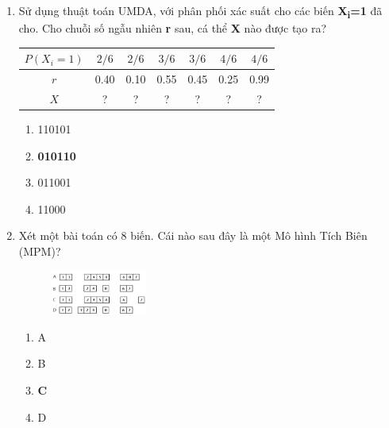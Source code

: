 \documentclass{book}
\begin{document}
\begin{enumerate}
    \item Sử dụng thuật toán UMDA, với phân phối xác suất cho các biến \textbf{X\textsubscript{i}=1} đã cho. Cho chuỗi số ngẫu nhiên \textbf{r} sau, cá thể \textbf{X} nào được tạo ra?
    \begin{table}[H]
        \centering
        \begin{tabular}{|c|c|c|c|c|c|c|}
            \toprule
            $P(X_i=1)$ & $2/6$ & $2/6$ & $3/6$ & $3/6$ & $4/6$ &  $4/6$ \\
            \midrule
            $r$ & 0.40 & 0.10 & 0.55 & 0.45 & 0.25 & 0.99 \\
            \midrule
            $X$ & ? & ? & ? & ? & ? & ? \\
            \bottomrule
        \end{tabular}
    \end{table}
    \begin{multicols}{2}
        \begin{enumerate}[label=\Alph*]
            \item 110101
            \item \textbf{010110}
            \item 011001
            \item 11000
        \end{enumerate}
    \end{multicols}

    \item Xét một bài toán có 8 biến. Cái nào sau đây là một Mô hình Tích Biên (MPM)?
    \begin{figure}[H]
        \centering
        \includegraphics[width=0.3\textwidth]{images/quiz5_2.png}
    \end{figure}
    \begin{multicols}{2}
        \begin{enumerate}[label=\Alph*]
            \item A
            \item B
            \item \textbf{C}
            \item D
        \end{enumerate}
    \end{multicols}


\end{enumerate}
\end{document}
